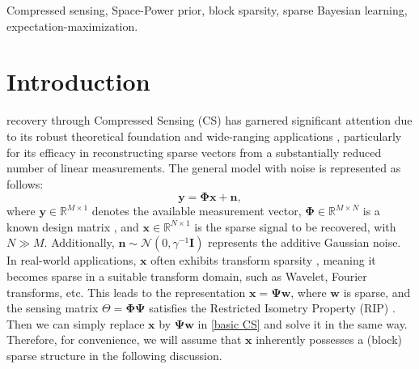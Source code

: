 \documentclass[lettersize,journal]{IEEEtran}
\theoremstyle{remark}
\begin{document}
\begin{IEEEkeywords}
Compressed sensing, Space-Power prior, block sparsity, sparse Bayesian learning, expectation-maximization.
\end{IEEEkeywords}

\section{Introduction}\label{intro}
 recovery through Compressed Sensing (CS) has garnered significant attention due to its robust theoretical foundation and wide-ranging applications \cite{donoho2006compressed}, particularly for its efficacy in reconstructing sparse vectors from a substantially reduced number of linear measurements. The general model with noise is represented as follows:
\begin{equation}
	\mathbf{y} = \mathbf{\Phi} \mathbf{x}+ \mathbf{n}, \label{basic CS}
\end{equation}
where  \(\mathbf{y} \in \mathbb{R}^{M \times 1}\) denotes the available measurement vector, \(\mathbf{\Phi} \in \mathbb{R}^{M \times N}\) is a known design matrix \cite{gorodnitsky1997sparse}, and \(\mathbf{x} \in \mathbb{R}^{N \times 1}\) is the sparse signal to be recovered, with \(N \gg M\). Additionally, \(\mathbf{n} \sim \mathcal{N}(0, \gamma^{-1} \mathbf{I})\) represents the additive Gaussian noise. In real-world applications, \(\mathbf{x}\) often exhibits transform sparsity \cite{donoho2006compressed}, meaning it becomes sparse in a suitable transform domain, such as Wavelet, Fourier transforms, etc. This leads to the representation \(\mathbf{x} = \boldsymbol{\Psi} \mathbf{w}\), where \(\mathbf{w}\) is sparse, and the sensing matrix \(\Theta = \boldsymbol{\Phi\Psi}\)  satisfies the Restricted Isometry Property (RIP) \cite{candes2005decoding}. Then we can simply replace $\mathbf{x}$ by $\boldsymbol{\Psi }\mathbf{w}$ in \eqref{basic CS} and solve it in the same way.  Therefore, for convenience, we will assume that \(\mathbf{x}\) inherently possesses a (block) sparse structure in the following discussion.
\end{document}

